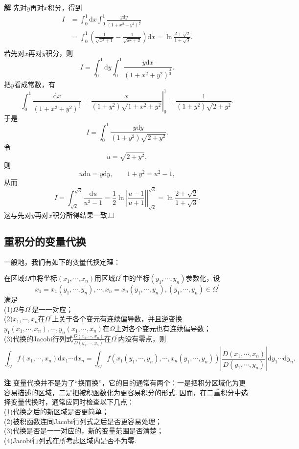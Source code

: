 \documentclass{ctexart}
\newenvironment{custom}[1]{\par\noindent \textbf{#1}\quad}{\par\vspace{1em}}
\begin{document}
\begin{custom}{解}
先对$y$再对$x$积分，得到
$$\begin{aligned}I&=\int_{0}^{1}{\mathrm{d}x\int_{0}^{1}{\frac{y\mathrm{d}y}{(1+x^{2}+y^{2})^{\frac{3}{2}}}}}\\
&=\int_{0}^{1}{\left(\frac{1}{\sqrt{x^{2}+1}}-\frac{1}{\sqrt{x^{2}+2}}\right)\mathrm{d}x}=\ln{\frac{2+\sqrt{2}}{1+\sqrt{3}}}.\\\end{aligned}$$
若先对$x$再对$y$积分，则
$$I=\int_{0}^{1}{\mathrm{d}y\int_{0}^{1}{\frac{y\mathrm{d}x}{(1+x^{2}+y^{2})^{\frac{3}{2}}}}}.$$
把$y$看成常数，有
$$\int_{0}^{1}{\frac{\mathrm{d}x}{(1+x^{2}+y^{2})^{\frac{3}{2}}}}
=\left.\frac{x}{(1+y^{2})\sqrt{1+x^{2}+y^{2}}}\right|_{0}^{1}
=\frac{1}{(1+y^{2})\sqrt{2+y^{2}}}.$$
于是
$$I=\int_{0}^{1}{\frac{y\mathrm{d}y}{(1+y^{2})\sqrt{2+y^{2}}}}.$$
令
$$u=\sqrt{2+y^{2}},$$
则
$$u\mathrm{d}u=y\mathrm{d}y,\qquad 1+y^{2}=u^{2}-1,$$
从而
$$I=\int_{\sqrt{2}}^{\sqrt{3}}{\frac{\mathrm{d}u}{u^{2}-1}}
=\frac12\left.\ln\left|\frac{u-1}{u+1}\right|\right|_{\sqrt{2}}^{\sqrt{3}}
=\ln\frac{2+\sqrt{2}}{1+\sqrt{3}}.$$
这与先对$y$再对$x$积分所得结果一致.$\hfill{\square}$
\end{custom}

\subsection{重积分的变量代换}
一般地，我们有如下的变量代换定理：
\begin{theorem}
在区域$\Omega$中将坐标$(x_{1},\cdots,x_{n})$用区域$\Omega^{\prime}$中的坐标$(y_{1},\cdots,y_{n})$参数化，设
$$x_{1}=x_{1}(y_{1},\cdots,y_{n}),\cdots,x_{n}=x_{n}(y_{1},\cdots,y_{n}),(y_{1},\cdots,y_{n})\in\Omega^{\prime}$$
满足\\
(1)$\Omega$与$\Omega^{\prime}$是一一对应；\\
(2)$x_{1},\cdots,x_{n}$在$\Omega^{\prime}$上关于各个变元有连续偏导数，并且逆变换$y_{1}(x_{1},\cdots,x_{n}),\cdots,y_{n}(x_{1},\cdots,x_{n})$在$\Omega$上对各个变元也有连续偏导数；\\
(3)代换的Jacobi行列式$\frac{D(x_{1},\cdots,x_{n})}{D(y_{1},\cdots,y_{n})}$在$\Omega^{\prime}$内没有零点，则
$$\int_{\Omega}{f(x_{1},\cdots,x_{n})\mathrm{d}x_{1}\cdots\mathrm{d}x_{n}}=\int_{\Omega}{f(x_{1}(y_{1},\cdots,y_{n}),\cdots,x_{n}(y_{1},\cdots,y_{n}))\left|\frac{D(x_{1},\cdots,x_{n})}{D(y_{1},\cdots,y_{n})}\right|\mathrm{d}y_{1}\cdots\mathrm{d}y_{n}}.$$
\end{theorem}
\begin{custom}{注}
变量代换并不是为了“换而换”，它的目的通常有两个：一是把积分区域化为更容易描述的区域，二是把被积函数化为更容易积分的形式. 因而，在二重积分中选择变量代换时，通常应同时检查以下几点：\\
(1)代换之后的新区域是否更简单；\\
(2)被积函数连同Jacobi行列式之后是否更容易处理；\\
(3)代换是否是一一对应的，新的变量范围是否清楚；\\
(4)Jacobi行列式在所考虑区域内是否不为零.
\end{custom}
\end{document}
